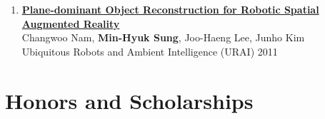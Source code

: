 \documentclass[letterpaper,10pt]{article} %
\newcommand{\blankline}{\quad\pagebreak[2]}
\begin{document}
\begin{enumerate}
\item \label{urai11}
\href{http://dx.doi.org/10.1109/URAI.2011.6145896}{\textbf{Plane-dominant Object Reconstruction for Robotic Spatial Augmented Reality}} \\
Changwoo Nam, \textbf{Min-Hyuk Sung}, Joo-Haeng Lee, Junho Kim \\
Ubiquitous Robots and Ambient Intelligence (URAI) 2011 \\
\blankline

%

\end{enumerate}

\blankline



\section{Honors and Scholarships}
\end{document}
